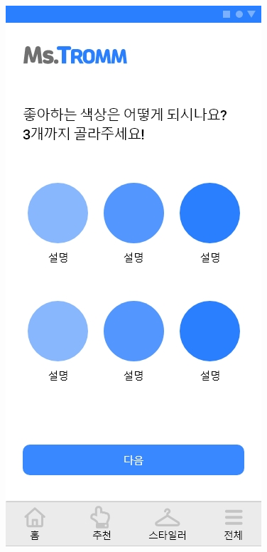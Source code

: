 \documentclass[conference]{IEEEtran}
\begin{document}
\begin{enumerate}
\begin{enumerate}
{            \includegraphics[scale=0.17]{5-2. 설문.jpg}
}
\end{enumerate}
\end{enumerate}
\end{document}
